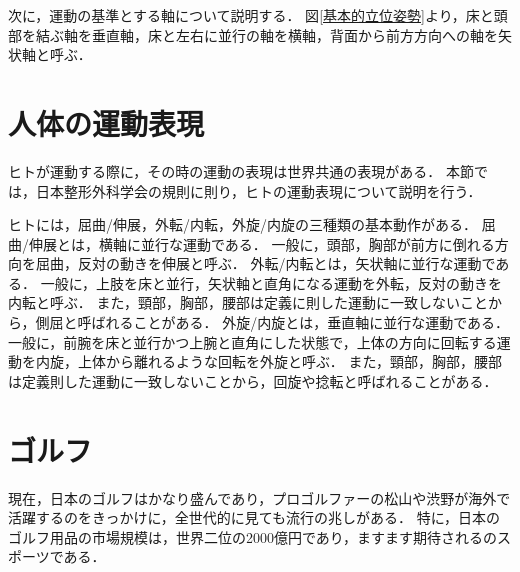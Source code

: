 次に，運動の基準とする軸について説明する．
図\ref{基本的立位姿勢}より，床と頭部を結ぶ軸を垂直軸，床と左右に並行の軸を横軸，背面から前方方向への軸を矢状軸と呼ぶ．



\section{人体の運動表現}
ヒトが運動する際に，その時の運動の表現は世界共通の表現がある．
本節では，日本整形外科学会の規則に則り，ヒトの運動表現について説明を行う．

ヒトには，屈曲/伸展，外転/内転，外旋/内旋の三種類の基本動作がある．
屈曲/伸展とは，横軸に並行な運動である．
一般に，頭部，胸部が前方に倒れる方向を屈曲，反対の動きを伸展と呼ぶ．
外転/内転とは，矢状軸に並行な運動である．
一般に，上肢を床と並行，矢状軸と直角になる運動を外転，反対の動きを内転と呼ぶ．
また，頸部，胸部，腰部は定義に則した運動に一致しないことから，側屈と呼ばれることがある．
外旋/内旋とは，垂直軸に並行な運動である．
一般に，前腕を床と並行かつ上腕と直角にした状態で，上体の方向に回転する運動を内旋，上体から離れるような回転を外旋と呼ぶ．
また，頸部，胸部，腰部は定義則した運動に一致しないことから，回旋や捻転と呼ばれることがある．

\section{ゴルフ}
%
現在，日本のゴルフはかなり盛んであり，プロゴルファーの松山や渋野が海外で活躍するのをきっかけに，全世代的に見ても流行の兆しがある．
特に，日本のゴルフ用品の市場規模は，世界二位の2000億円であり，ますます期待されるのスポーツである．

